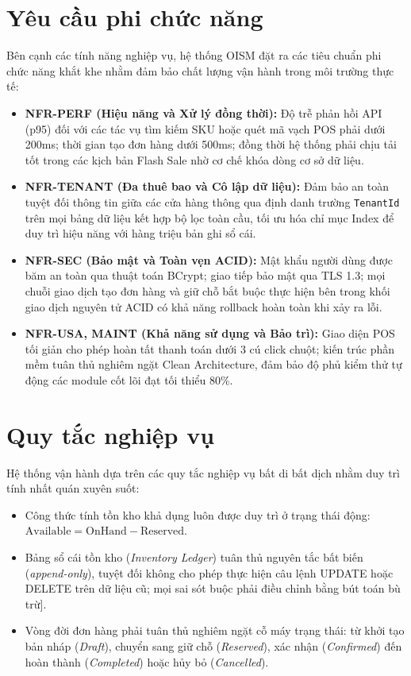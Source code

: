 \documentclass[12pt,a4paper]{report}
\begin{document}
	\section{Yêu cầu phi chức năng}
	Bên cạnh các tính năng nghiệp vụ, hệ thống OISM đặt ra các tiêu chuẩn phi chức năng khắt khe nhằm đảm bảo chất lượng vận hành trong môi trường thực tế:
	\begin{itemize}
		\item \textbf{NFR-PERF (Hiệu năng và Xử lý đồng thời):} Độ trễ phản hồi API (p95) đối với các tác vụ tìm kiếm SKU hoặc quét mã vạch POS phải dưới 200ms; thời gian tạo đơn hàng dưới 500ms; đồng thời hệ thống phải chịu tải tốt trong các kịch bản Flash Sale nhờ cơ chế khóa dòng cơ sở dữ liệu.
		\item \textbf{NFR-TENANT (Đa thuê bao và Cô lập dữ liệu):} Đảm bảo an toàn tuyệt đối thông tin giữa các cửa hàng thông qua định danh trường \texttt{TenantId} trên mọi bảng dữ liệu kết hợp bộ lọc toàn cầu, tối ưu hóa chỉ mục Index để duy trì hiệu năng với hàng triệu bản ghi sổ cái.
		\item \textbf{NFR-SEC (Bảo mật và Toàn vẹn ACID):} Mật khẩu người dùng được băm an toàn qua thuật toán BCrypt; giao tiếp bảo mật qua TLS 1.3; mọi chuỗi giao dịch tạo đơn hàng và giữ chỗ bắt buộc thực hiện bên trong khối giao dịch nguyên tử ACID có khả năng rollback hoàn toàn khi xảy ra lỗi.
		\item \textbf{NFR-USA, MAINT (Khả năng sử dụng và Bảo trì):} Giao diện POS tối giản cho phép hoàn tất thanh toán dưới 3 cú click chuột; kiến trúc phần mềm tuân thủ nghiêm ngặt Clean Architecture, đảm bảo độ phủ kiểm thử tự động các module cốt lõi đạt tối thiểu 80\%.
	\end{itemize}
	
	\section{Quy tắc nghiệp vụ}
	Hệ thống vận hành dựa trên các quy tắc nghiệp vụ bất di bất dịch nhằm duy trì tính nhất quán xuyên suốt:
	\begin{itemize}
		\item Công thức tính tồn kho khả dụng luôn được duy trì ở trạng thái động: $\text{Available} = \text{OnHand} - \text{Reserved}$.
		\item Bảng sổ cái tồn kho (\textit{Inventory Ledger}) tuân thủ nguyên tắc bất biến (\textit{append-only}), tuyệt đối không cho phép thực hiện câu lệnh UPDATE hoặc DELETE trên dữ liệu cũ; mọi sai sót buộc phải điều chỉnh bằng bút toán bù trừ].
		\item Vòng đời đơn hàng phải tuân thủ nghiêm ngặt cỗ máy trạng thái: từ khởi tạo bản nháp (\textit{Draft}), chuyển sang giữ chỗ (\textit{Reserved}), xác nhận (\textit{Confirmed}) đến hoàn thành (\textit{Completed}) hoặc hủy bỏ (\textit{Cancelled}).
	\end{itemize}
	
\end{document}
